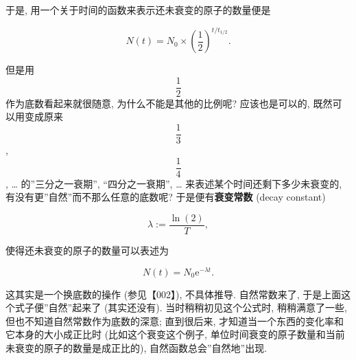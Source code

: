 于是, 用一个关于时间的函数来表示还未衰变的原子的数量便是

\[N(t)=N_0\times\left(\frac{1}{2}\right)^{t/t_{1/2}}.\]

但是用 \[\frac{1}{2}\] 作为底数看起来就很随意, 为什么不能是其他的比例呢?
应该也是可以的, 既然可以用变成原来 \[\frac{1}{3}\] , \[\frac{1}{4}\] ,
\ldots{} 的''三分之一衰期'', ``四分之一衰期'', \ldots{}
来表述某个时间还剩下多少未衰变的, 有没有更''自然''而不那么任意的底数呢?
于是便有\textbf{衰变常数} (decay constant)

\[\lambda:=\frac{\ln(2)}{T},\]

使得还未衰变的原子的数量可以表述为

\[N(t)=N_0\mathrm{e}^{-\lambda t}.\]

这其实是一个换底数的操作 (参见【002】), 不具体推导. 自然常数来了,
于是上面这个式子便''自然''起来了 (其实还没有). 当时稍稍初见这个公式时,
稍稍满意了一些, 但也不知道自然常数作为底数的深意; 直到很后来,
才知道当一个东西的变化率和它本身的大小成正比时 (比如这个衰变这个例子,
单位时间衰变的原子数量和当前未衰变的原子的数量是成正比的),
自然函数总会''自然地''出现.

